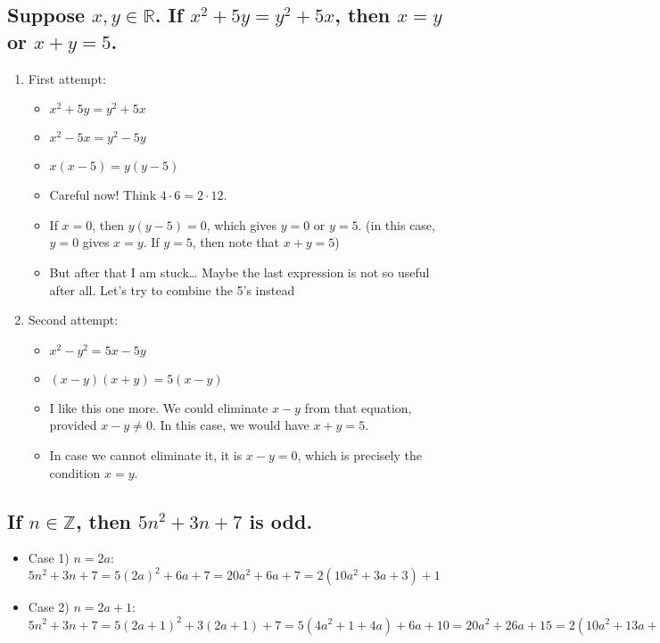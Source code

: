 \documentclass[11pt, oneside]{amsart}
\begin{document}
\subsection{Suppose \(x, y \in \mathbb{R}\).  If \(x^2+5y = y^2+5x\), then \(x=y\) or \(x+y=5\).}
\label{sec:org00765fa}
\begin{enumerate}
\item First attempt:
\label{sec:orgb3dfaf0}
\begin{itemize}
\item \(x^2+5y = y^2+5x\)
\item \(x^2-5x = y^2-5y\)
\item \(x(x-5) = y(y-5)\)
\item Careful now!  Think \(4 \cdot 6 = 2 \cdot 12\).
\item If \(x=0\), then \(y(y-5)=0\), which gives \(y=0\) or \(y=5\).  (in this case, \(y=0\) gives \(x=y\).  If \(y=5\), then note that \(x+y=5\))
\item But after that I am stuck\ldots{} Maybe the last expression is not so useful after all.  Let's try to combine the 5's instead
\end{itemize}
\item Second attempt:
\label{sec:orgb762f15}
\begin{itemize}
\item \(x^2-y^2 = 5x-5y\)
\item \((x-y)(x+y)=5(x-y)\)
\item I like this one more. We could eliminate \(x-y\) from that equation, provided \(x-y \neq 0\).  In this case, we would have \(x+y=5\).
\item In case we cannot eliminate it, it is \(x-y=0\), which is precisely the condition \(x=y\).
\end{itemize}
\end{enumerate}

\subsection{If \(n \in \mathbb{Z}\), then \(5n^2+3n+7\) is odd.}
\label{sec:org9c546a8}
\begin{itemize}
\item Case 1) \(n=2a\): \(5n^2+3n+7 = 5(2a)^2+6a+7=20a^2+6a+7 = 2(10a^2+3a+3)+1\)
\item Case 2) \(n=2a+1\): \(5n^2+3n+7 = 5(2a+1)^2+3(2a+1)+7 = 5(4a^2+1+4a)+6a+10 = 20a^2+26a+15 =2(10a^2+13a+7)+1\)
\end{itemize}
\end{document}
